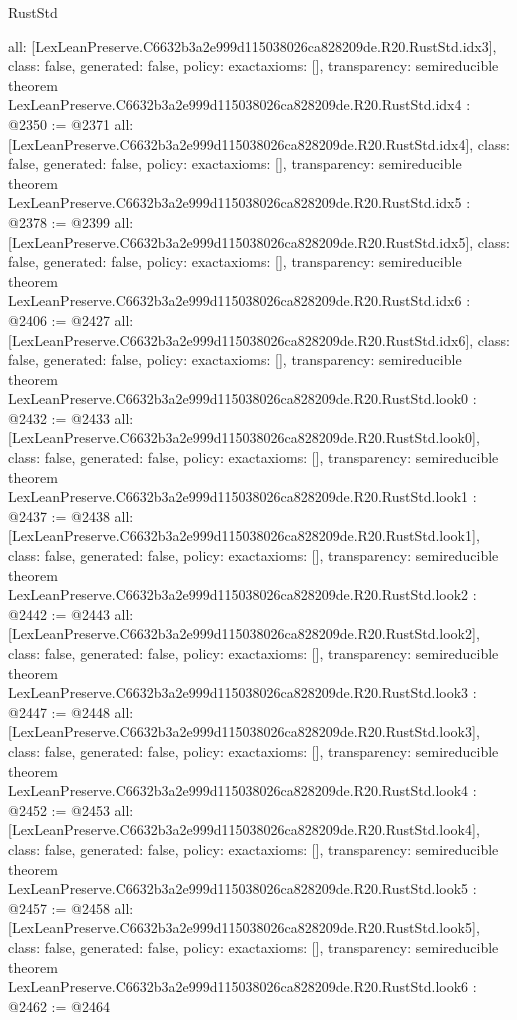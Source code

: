 \begin{lexlean}{RustStd}
\begin{coremodule}
{  all: [LexLeanPreserve.C6632b3a2e999d115038026ca828209de.R20.RustStd.idx3],
  class: false,
  generated: false,
  policy: exact{axioms: []},
  transparency: semireducible
}
theorem LexLeanPreserve.C6632b3a2e999d115038026ca828209de.R20.RustStd.idx4 : @2350 := @2371 {
  all: [LexLeanPreserve.C6632b3a2e999d115038026ca828209de.R20.RustStd.idx4],
  class: false,
  generated: false,
  policy: exact{axioms: []},
  transparency: semireducible
}
theorem LexLeanPreserve.C6632b3a2e999d115038026ca828209de.R20.RustStd.idx5 : @2378 := @2399 {
  all: [LexLeanPreserve.C6632b3a2e999d115038026ca828209de.R20.RustStd.idx5],
  class: false,
  generated: false,
  policy: exact{axioms: []},
  transparency: semireducible
}
theorem LexLeanPreserve.C6632b3a2e999d115038026ca828209de.R20.RustStd.idx6 : @2406 := @2427 {
  all: [LexLeanPreserve.C6632b3a2e999d115038026ca828209de.R20.RustStd.idx6],
  class: false,
  generated: false,
  policy: exact{axioms: []},
  transparency: semireducible
}
theorem LexLeanPreserve.C6632b3a2e999d115038026ca828209de.R20.RustStd.look0 : @2432 := @2433 {
  all: [LexLeanPreserve.C6632b3a2e999d115038026ca828209de.R20.RustStd.look0],
  class: false,
  generated: false,
  policy: exact{axioms: []},
  transparency: semireducible
}
theorem LexLeanPreserve.C6632b3a2e999d115038026ca828209de.R20.RustStd.look1 : @2437 := @2438 {
  all: [LexLeanPreserve.C6632b3a2e999d115038026ca828209de.R20.RustStd.look1],
  class: false,
  generated: false,
  policy: exact{axioms: []},
  transparency: semireducible
}
theorem LexLeanPreserve.C6632b3a2e999d115038026ca828209de.R20.RustStd.look2 : @2442 := @2443 {
  all: [LexLeanPreserve.C6632b3a2e999d115038026ca828209de.R20.RustStd.look2],
  class: false,
  generated: false,
  policy: exact{axioms: []},
  transparency: semireducible
}
theorem LexLeanPreserve.C6632b3a2e999d115038026ca828209de.R20.RustStd.look3 : @2447 := @2448 {
  all: [LexLeanPreserve.C6632b3a2e999d115038026ca828209de.R20.RustStd.look3],
  class: false,
  generated: false,
  policy: exact{axioms: []},
  transparency: semireducible
}
theorem LexLeanPreserve.C6632b3a2e999d115038026ca828209de.R20.RustStd.look4 : @2452 := @2453 {
  all: [LexLeanPreserve.C6632b3a2e999d115038026ca828209de.R20.RustStd.look4],
  class: false,
  generated: false,
  policy: exact{axioms: []},
  transparency: semireducible
}
theorem LexLeanPreserve.C6632b3a2e999d115038026ca828209de.R20.RustStd.look5 : @2457 := @2458 {
  all: [LexLeanPreserve.C6632b3a2e999d115038026ca828209de.R20.RustStd.look5],
  class: false,
  generated: false,
  policy: exact{axioms: []},
  transparency: semireducible
}
theorem LexLeanPreserve.C6632b3a2e999d115038026ca828209de.R20.RustStd.look6 : @2462 := @2464 {
}
\end{coremodule}
\end{lexlean}
